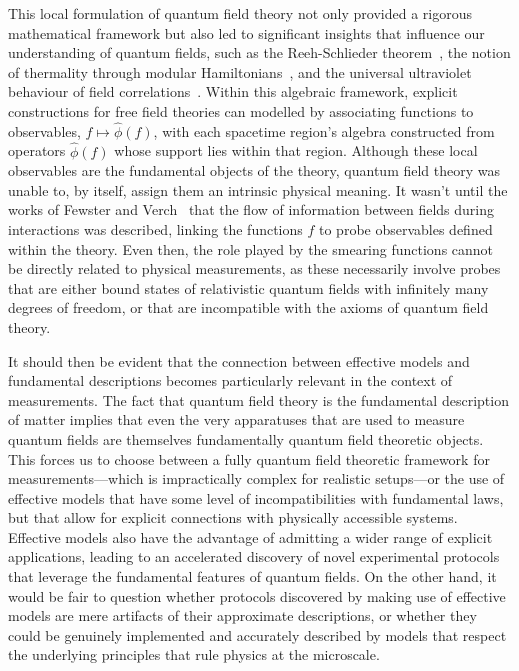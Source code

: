 \documentclass[letterpaper,12pt,titlepage,oneside,final]{book}
\begin{document}
This local formulation of quantum field theory not only provided a rigorous mathematical framework but also led to significant insights that influence our understanding of quantum fields, such as the Reeh-Schlieder theorem~\cite{ReehSchli}, the notion of thermality through modular Hamiltonians~\cite{Takesaki}, and the universal ultraviolet behaviour of field correlations~\cite{kayWald}. Within this algebraic framework, explicit constructions for free field theories can modelled by associating functions to observables, $f \mapsto \hat{\phi}(f)$, with each spacetime region's algebra constructed from operators $\hat{\phi}(f)$ whose support lies within that region. Although these local observables are the fundamental objects of the theory, quantum field theory was unable to, by itself, assign them an intrinsic physical meaning. It wasn't until the works of Fewster and Verch~\cite{FVOG} that the flow of information between fields during interactions was described, linking the functions $f$ to probe observables defined within the theory. Even then, the role played by the smearing functions cannot be directly related to physical measurements, as these necessarily involve probes that are either bound states of relativistic quantum fields with infinitely many degrees of freedom, or that are incompatible with the axioms of quantum field theory.

It should then be evident that the connection between effective models and fundamental descriptions becomes particularly relevant in the context of measurements. The fact that quantum field theory is the fundamental description of matter implies that even the very apparatuses that are used to measure quantum fields are themselves fundamentally quantum field theoretic objects. This forces us to choose between a fully quantum field theoretic framework for measurements---which is impractically complex for realistic setups---or the use of effective models that have some level of incompatibilities with fundamental laws, but that allow for explicit connections with physically accessible systems. Effective models also have the advantage of admitting a wider range of explicit applications, leading to an accelerated discovery of novel experimental protocols that leverage the fundamental features of quantum fields. On the other hand, it would be fair to question whether protocols discovered by making use of effective models are mere artifacts of their approximate descriptions, or whether they could be genuinely implemented and accurately described by models that respect the underlying principles that rule physics at the microscale.
\end{document}
